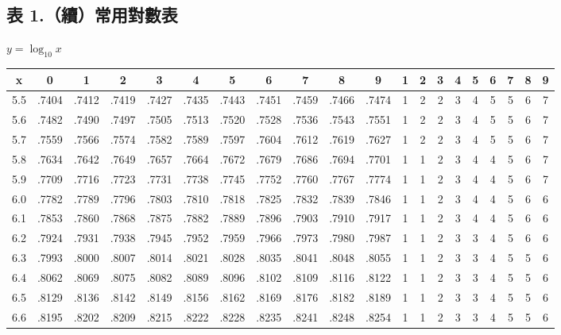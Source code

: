 \subsection*{表 1.\quad （續）常用對數表}
\begin{center} $y = \log_{10} x$ \end{center}
{\centering\fontsize{7.5pt}{8.8pt}\selectfont\setlength{\tabcolsep}{1.5pt}\renewcommand{\arraystretch}{0.96}
\begin{tabular}{|c|cccccccccc|ccccccccc|}
\hline
x & 0 & 1 & 2 & 3 & 4 & 5 & 6 & 7 & 8 & 9 & 1 & 2 & 3 & 4 & 5 & 6 & 7 & 8 & 9 \\ \hline
5.5 & .7404 & .7412 & .7419 & .7427 & .7435 & .7443 & .7451 & .7459 & .7466 & .7474 & 1 & 2 & 2 & 3 & 4 & 5 & 5 & 6 & 7 \\
5.6 & .7482 & .7490 & .7497 & .7505 & .7513 & .7520 & .7528 & .7536 & .7543 & .7551 & 1 & 2 & 2 & 3 & 4 & 5 & 5 & 6 & 7 \\
5.7 & .7559 & .7566 & .7574 & .7582 & .7589 & .7597 & .7604 & .7612 & .7619 & .7627 & 1 & 2 & 2 & 3 & 4 & 5 & 5 & 6 & 7 \\
5.8 & .7634 & .7642 & .7649 & .7657 & .7664 & .7672 & .7679 & .7686 & .7694 & .7701 & 1 & 1 & 2 & 3 & 4 & 4 & 5 & 6 & 7 \\
5.9 & .7709 & .7716 & .7723 & .7731 & .7738 & .7745 & .7752 & .7760 & .7767 & .7774 & 1 & 1 & 2 & 3 & 4 & 4 & 5 & 6 & 7 \\
6.0 & .7782 & .7789 & .7796 & .7803 & .7810 & .7818 & .7825 & .7832 & .7839 & .7846 & 1 & 1 & 2 & 3 & 4 & 4 & 5 & 6 & 6 \\
6.1 & .7853 & .7860 & .7868 & .7875 & .7882 & .7889 & .7896 & .7903 & .7910 & .7917 & 1 & 1 & 2 & 3 & 4 & 4 & 5 & 6 & 6 \\
6.2 & .7924 & .7931 & .7938 & .7945 & .7952 & .7959 & .7966 & .7973 & .7980 & .7987 & 1 & 1 & 2 & 3 & 3 & 4 & 5 & 6 & 6 \\
6.3 & .7993 & .8000 & .8007 & .8014 & .8021 & .8028 & .8035 & .8041 & .8048 & .8055 & 1 & 1 & 2 & 3 & 3 & 4 & 5 & 5 & 6 \\
6.4 & .8062 & .8069 & .8075 & .8082 & .8089 & .8096 & .8102 & .8109 & .8116 & .8122 & 1 & 1 & 2 & 3 & 3 & 4 & 5 & 5 & 6 \\
6.5 & .8129 & .8136 & .8142 & .8149 & .8156 & .8162 & .8169 & .8176 & .8182 & .8189 & 1 & 1 & 2 & 3 & 3 & 4 & 5 & 5 & 6 \\
6.6 & .8195 & .8202 & .8209 & .8215 & .8222 & .8228 & .8235 & .8241 & .8248 & .8254 & 1 & 1 & 2 & 3 & 3 & 4 & 5 & 5 & 6 \\

\end{tabular}}
